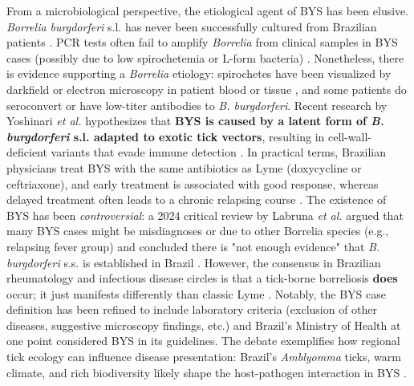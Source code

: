 \documentclass[11pt,letterpaper]{article}
\begin{document}
From a microbiological perspective, the etiological agent of BYS has been elusive. \textit{Borrelia burgdorferi} s.l. has never been successfully cultured from Brazilian patients \citep{Yoshinari2022p, Yoshinari2022q}. PCR tests often fail to amplify \textit{Borrelia} from clinical samples in BYS cases (possibly due to low spirochetemia or L-form bacteria) \citep{Lucca2024l}. Nonetheless, there is evidence supporting a \textit{Borrelia} etiology: spirochetes have been visualized by darkfield or electron microscopy in patient blood or tissue \citep{Lucca2024m}, and some patients do seroconvert or have low-titer antibodies to \textit{B. burgdorferi}. Recent research by Yoshinari \textit{et al.} hypothesizes that \textbf{BYS is caused by a latent form of \textit{B. burgdorferi} s.l. adapted to exotic tick vectors}, resulting in cell-wall-deficient variants that evade immune detection \citep{Yoshinari2022r, Yoshinari2022s}. In practical terms, Brazilian physicians treat BYS with the same antibiotics as Lyme (doxycycline or ceftriaxone), and early treatment is associated with good response, whereas delayed treatment often leads to a chronic relapsing course \citep{Yoshinari2022t}. The existence of BYS has been \textit{controversial}: a 2024 critical review by Labruna \textit{et al.} argued that many BYS cases might be misdiagnoses or due to other Borrelia species (e.g., relapsing fever group) and concluded there is "not enough evidence" that \textit{B. burgdorferi} s.s. is established in Brazil \citep{Labruna2024a}. However, the consensus in Brazilian rheumatology and infectious disease circles is that a tick-borne borreliosis \textbf{does} occur; it just manifests differently than classic Lyme \citep{Yoshinari2022u, Yoshinari2022v}. Notably, the BYS case definition has been refined to include laboratory criteria (exclusion of other diseases, suggestive microscopy findings, etc.) and Brazil's Ministry of Health at one point considered BYS in its guidelines. The debate exemplifies how regional tick ecology can influence disease presentation: Brazil's \textit{Amblyomma} ticks, warm climate, and rich biodiversity likely shape the host-pathogen interaction in BYS \citep{Yoshinari2022w}.
\end{document}
